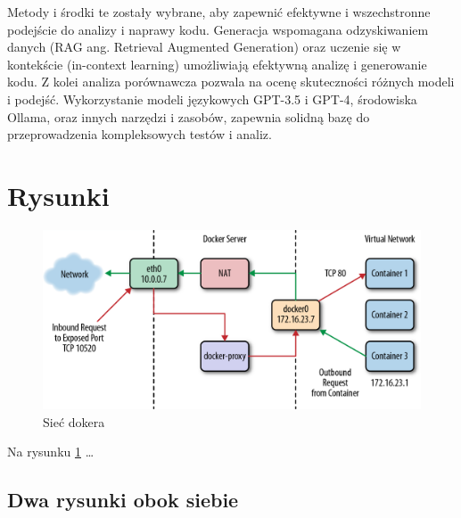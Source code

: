 Metody i środki te zostały wybrane, aby zapewnić efektywne i wszechstronne podejście do analizy i naprawy kodu. Generacja wspomagana odzyskiwaniem danych (RAG ang. Retrieval Augmented Generation) oraz uczenie się w kontekście                                                                                                                                                                                                                                                                                                                                                                                                                                                                                                                                                           (in-context learning) umożliwiają efektywną analizę i generowanie kodu. 
Z kolei analiza porównawcza pozwala na ocenę skuteczności różnych modeli i podejść. 
Wykorzystanie modeli językowych GPT-3.5 i GPT-4, środowiska Ollama, oraz innych narzędzi i zasobów, zapewnia solidną bazę do przeprowadzenia kompleksowych testów i analiz.

\section{Rysunki}

\begin{figure}
\centering\includegraphics[width=.6\textwidth]{img/swarm-network}
\caption{Sieć dokera }  \label{rys:network}
\end{figure}

Na rysunku \ref{rys:network} \dots


\subsection{Dwa rysunki obok siebie}

